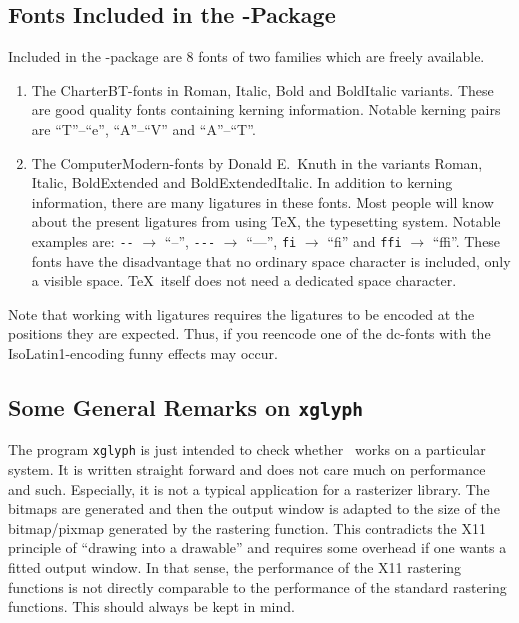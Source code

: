 \subsection{Fonts Included in the \tonelib-Package}
\label{fonts}%
Included in the \tonelib-package are 8 fonts of two families which
are freely available. 
\begin{enumerate}
\item The CharterBT-fonts in Roman, Italic, Bold and BoldItalic
  variants. These are good quality fonts containing kerning
  information. Notable kerning pairs are ``T''--``e'', ``A''--``V''
  and ``A''--``T''.
\item The ComputerModern-fonts by Donald E.~Knuth in the variants
  Roman, Italic, BoldExtended and BoldExtendedItalic. In addition to
  kerning information, there are many ligatures in these
  fonts. Most people will know about the present ligatures from using
  \TeX, the typesetting system. Notable examples are: 
  \verb+--+ $\rightarrow$ ``--'', 
  \verb+---+ $\rightarrow$ ``---'', 
    \verb+fi+ $\rightarrow$ ``fi'' and
  \verb+ffi+ $\rightarrow$ ``ffi''. 
  These fonts have the disadvantage that no ordinary space character
  is included, only a visible space. \TeX\ itself does not need a
  dedicated space character. 
\end{enumerate}
Note that working with ligatures requires the ligatures to be
encoded at the positions they are expected. Thus, if you reencode one of the
dc-fonts with the IsoLatin1-encoding funny effects may occur.

\subsection{Some General Remarks on {\tt xglyph}}
The program \verb+xglyph+ is just intended to check whether \tonelib\ works on
a particular system. It is written straight forward and does not care much on
performance and such. Especially, it is not a typical application for a
rasterizer library. The bitmaps are generated and then the output window is
adapted to the size of the bitmap/pixmap generated by the rastering
function. This contradicts the X11 principle of ``drawing into a drawable''
and requires some overhead if one wants a fitted output window. In that sense,
the performance of the X11 rastering functions is not directly comparable to
the performance of the standard rastering functions. This should always be
kept in mind.



